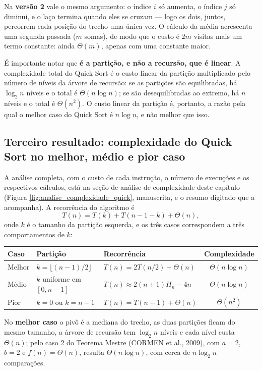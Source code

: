 \qquad Na \textbf{versão 2} vale o mesmo argumento: o índice $i$ só
aumenta, o índice $j$ só diminui, e o laço termina quando eles se
cruzam --- logo os dois, juntos, percorrem cada posição do trecho uma
única vez. O cálculo da média acrescenta uma segunda passada
($m$ somas), de modo que o custo é $2m$ visitas mais um termo
constante: ainda $\Theta(m)$, apenas com uma constante maior.

\qquad É importante notar que \textbf{é a partição, e não a recursão,
que é linear}. A complexidade total do Quick Sort é o custo linear da
partição multiplicado pelo número de níveis da árvore de recursão: se
as partições são equilibradas, há $\log_2 n$ níveis e o total é
$\Theta(n \log n)$; se são desequilibradas ao extremo, há $n$ níveis e
o total é $\Theta(n^2)$. O custo linear da partição é, portanto, a
razão pela qual o melhor caso do Quick Sort é $n \log n$, e não melhor
que isso.

\subsection{Terceiro resultado: complexidade do Quick Sort no melhor, médio e pior caso}

\qquad A análise completa, com o custo de cada instrução, o número de
execuções e os respectivos cálculos, está na seção de análise de
complexidade deste capítulo (Figura
\ref{fig:analise_complexidade_quick}, manuscrita, e o resumo digitado
que a acompanha). A recorrência do algoritmo é
\[
T(n) = T(k) + T(n-1-k) + \Theta(n),
\]
onde $k$ é o tamanho da partição esquerda, e os três casos
correspondem a três comportamentos de $k$:

\begin{center}
\begin{tabular}{|l|l|l|c|}
    \hline
    Caso & Partição & Recorrência & Complexidade \\
    \hline
    Melhor & $k = \lfloor (n-1)/2 \rfloor$ & $T(n) = 2T(n/2) + \Theta(n)$ & $\Theta(n \log n)$ \\
    \hline
    Médio & $k$ uniforme em $[0, n-1]$ & $T(n) \approx 2(n+1)H_n - 4n$ & $\Theta(n \log n)$ \\
    \hline
    Pior & $k = 0$ ou $k = n-1$ & $T(n) = T(n-1) + \Theta(n)$ & $\Theta(n^2)$ \\
    \hline
\end{tabular}
\end{center}

\qquad No \textbf{melhor caso} o pivô é a mediana do trecho, as duas
partições ficam do mesmo tamanho, a árvore de recursão tem
$\log_2 n$ níveis e cada nível custa $\Theta(n)$; pelo caso 2 do
Teorema Mestre (CORMEN et al., 2009), com $a = 2$, $b = 2$ e
$f(n) = \Theta(n)$, resulta $\Theta(n \log n)$, com cerca de
$n\log_2 n$ comparações.

